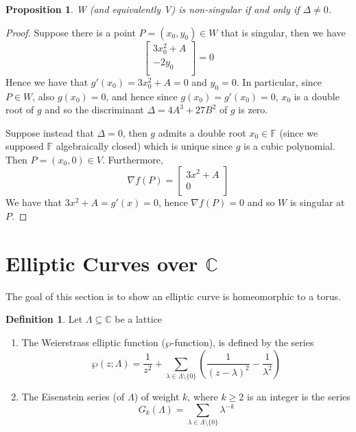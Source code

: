 \documentclass{article}
\newtheorem{proposition}[theorem]{Proposition}
\theoremstyle{definition}
\newtheorem{definition}{Definition}[section]
\theoremstyle{remark}
\newcommand{\F}{\mathbb{F}}
\newcommand{\C}{\mathbb{C}}
\begin{document}
\begin{proposition}
	W (and equivalently V)
	is non-singular if and only if $\Delta \neq 0$.
\end{proposition}
\begin{proof}
	Suppose there is a point $P = (x_0, y_0) \in W$ that is singular,
	then we have
	\begin{equation*}
		\begin{bmatrix}
			3x_0^2 + A\\
			-2y_0\\
		\end{bmatrix} = 0
	\end{equation*}
	Hence we have that $g'(x_0) = 3x_0^2 + A = 0$ and $y_0 = 0$.
	In particular, since $P \in W$, also 
	$g(x_0) = 0$, and hence since $g(x_0) = g'(x_0) = 0$,
	$x_0$ is a double root of $g$ and so the discriminant
	$\Delta = 4A^3 + 27B^2$ of $g$ is zero.

	Suppose instead that $\Delta = 0$, then $g$ admits a double root
	$x_0 \in \F$ (since we supposed $\F$ algebraically closed)
	which is unique since $g$ is a cubic polynomial.
	Then $P = (x_0, 0) \in V$.
	Furthermore,
	\begin{equation*}
		\nabla f(P) =
		\begin{bmatrix}
			3x^2 + A\\
			0\\
		\end{bmatrix}
	\end{equation*}
	We have that $3x^2 + A = g'(x) = 0$, hence $\nabla f(P) = 0$
	and so $W$ is singular at $P$.
\end{proof}

\section{Elliptic Curves over \texorpdfstring{$\C$}{C}}
\label{sec:over-C}

The goal of this section is to show an elliptic curve is
homeomorphic to a torus.

\begin{definition}
	Let $\Lambda \subseteq \C$ be a lattice
	\begin{enumerate}[label=(\alph*)]
		\item
			The Weierstrass
			elliptic function ($\wp$-function),
			is defined by the series
			\begin{equation*}
				\wp(z; \Lambda) = \frac{1}{z^2}
				+ \sum_{\lambda \in \Lambda\setminus\{0\}}
				\left(
					\frac{1}{(z-\lambda)^2} - \frac{1}{\lambda^2}
				\right)
			\end{equation*}
		\item
			The Eisenstein series (of $\Lambda$) of weight $k$,
			where $k \geq 2$ is an integer
			is the series
			\begin{equation*}
				G_k(\Lambda) = \sum_{\lambda \in \Lambda\setminus\{0\}}
				\lambda^{-k}
			\end{equation*}
	\end{enumerate}
\end{definition}
\end{document}
